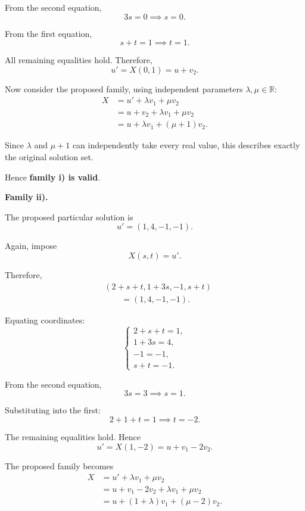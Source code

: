 \begin{enumerate}[label=\alph*)]
\begin{answer}
    From the second equation,
    $$
    3s=0
    \implies s=0.
    $$

    From the first equation,
    $$
    s+t=1
    \implies t=1.
    $$

    All remaining equalities hold.
    Therefore,
    $$
    u'=X(0,1)=u+v_2.
    $$

    Now consider the proposed family, using independent parameters
    $\lambda,\mu\in\mathbb{R}$:
    $$
    \begin{aligned}
    X
    &=u'+\lambda v_1+\mu v_2\\
    &=u+v_2+\lambda v_1+\mu v_2\\
    &=u+\lambda v_1+(\mu+1)v_2.
    \end{aligned}
    $$

    Since $\lambda$ and $\mu+1$ can independently take every real value, this describes
    exactly the original solution set.

    Hence \textbf{family i) is valid}.

    \textbf{Family ii).}

    The proposed particular solution is
    $$
    u'=(1,4,-1,-1).
    $$

    Again, impose
    $$
    X(s,t)=u'.
    $$

    Therefore,
    $$
    \begin{aligned}
    &(2+s+t,1+3s,-1,s+t)\\
    &\qquad=(1,4,-1,-1).
    \end{aligned}
    $$

    Equating coordinates:
    $$
    \begin{cases}
    2+s+t=1,\\
    1+3s=4,\\
    -1=-1,\\
    s+t=-1.
    \end{cases}
    $$

    From the second equation,
    $$
    3s=3
    \implies s=1.
    $$

    Substituting into the first:
    $$
    2+1+t=1
    \implies t=-2.
    $$

    The remaining equalities hold.
    Hence
    $$
    u'=X(1,-2)=u+v_1-2v_2.
    $$

    The proposed family becomes
    $$
    \begin{aligned}
    X
    &=u'+\lambda v_1+\mu v_2\\
    &=u+v_1-2v_2
      +\lambda v_1+\mu v_2\\
    &=u+(1+\lambda)v_1
      +(\mu-2)v_2.
    \end{aligned}
    $$


\end{answer}
\end{enumerate}
